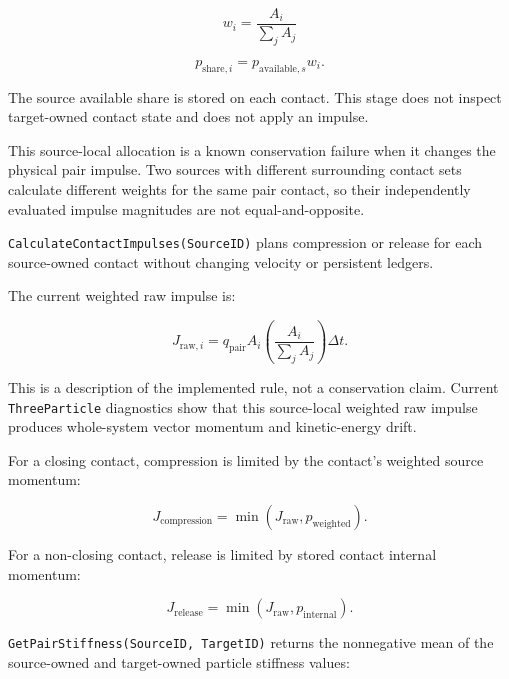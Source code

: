 \begin{equation}
w_i = \frac{A_i}{\sum_j A_j}
\end{equation}

\begin{equation}
p_{\mathrm{share},i} = p_{\mathrm{available},s} w_i.
\end{equation}

The source available share is stored on each contact.  This stage does not
inspect target-owned contact state and does not apply an impulse.

This source-local allocation is a known conservation failure when it changes
the physical pair impulse.  Two sources with different surrounding contact
sets calculate different weights for the same pair contact, so their
independently evaluated impulse magnitudes are not equal-and-opposite.


\texttt{CalculateContactImpulses(SourceID)} plans compression or release for
each source-owned contact without changing velocity or persistent ledgers.

The current weighted raw impulse is:

\begin{equation}
J_{\mathrm{raw},i}
=
q_{\mathrm{pair}} A_i
\left(\frac{A_i}{\sum_j A_j}\right)
\Delta t.
\end{equation}

This is a description of the implemented rule, not a conservation claim.
Current \texttt{ThreeParticle} diagnostics show that this source-local weighted
raw impulse produces whole-system vector momentum and kinetic-energy drift.

For a closing contact, compression is limited by the contact's weighted source
momentum:

\begin{equation}
J_{\mathrm{compression}}
=
\min(J_{\mathrm{raw}},p_{\mathrm{weighted}}).
\end{equation}

For a non-closing contact, release is limited by stored contact internal
momentum:

\begin{equation}
J_{\mathrm{release}}
=
\min(J_{\mathrm{raw}},p_{\mathrm{internal}}).
\end{equation}


\texttt{GetPairStiffness(SourceID, TargetID)} returns the nonnegative mean of
the source-owned and target-owned particle stiffness values:

